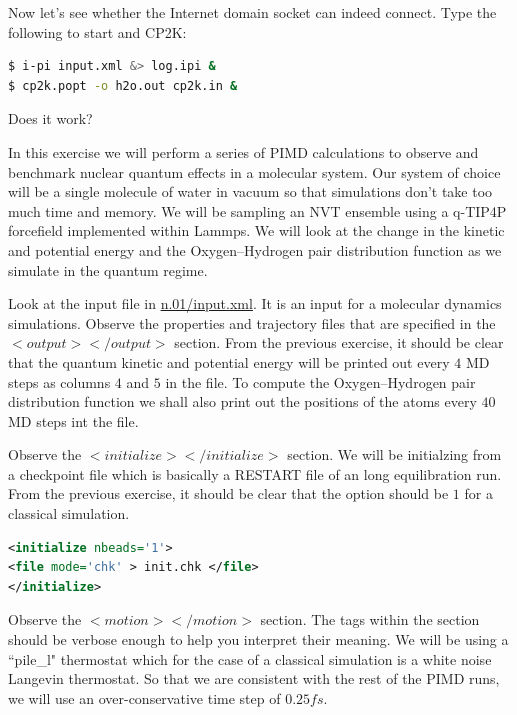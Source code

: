 \documentclass{article}
\begin{document}
\begin{Exercise}[label={basic},title={Keywords, outputs, and units of \ipi{}}]
\Question
Now let's see whether the Internet domain socket can indeed connect.
Type the following to start \ipi{} and CP2K:
\begin{lstlisting}[language=bash]
$ i-pi input.xml &> log.ipi &
$ cp2k.popt -o h2o.out cp2k.in &
\end{lstlisting}
Does it work?

\end{Exercise}

\begin{Exercise}[label={basic},title={Benchmark of quantum effects in a water molecule}]
\noindent In this exercise we will perform a series of PIMD calculations to observe and benchmark nuclear quantum effects in a molecular system. Our system of choice will be a single molecule of water in vacuum so that simulations don't take too much time and memory. We will be sampling an NVT ensemble using a q-TIP4P forcefield implemented within Lammps. We will look at the change in the kinetic and potential energy and the Oxygen--Hydrogen pair distribution function as we simulate in the quantum regime.

\Question
Look at the \ipi{} input file in \url{n.01/input.xml}. It is an \ipi{} input for a molecular dynamics simulations. Observe the 
properties and trajectory files that are specified in the \lstinxml$<output></output>$ section. From the previous exercise, it should be clear that the quantum kinetic and potential energy will be printed out every $4$ MD steps as columns $4$ and $5$ in the  file. To compute the Oxygen--Hydrogen pair distribution function we shall also print out the positions of the atoms every $40$ MD steps int the  file.

\Question
Observe the \lstinxml$<initialize></initialize>$ section. We will be initialzing from a checkpoint file  which is basically a RESTART file of an long equilibration run. From the previous exercise, it should be clear that the option  should be $1$ for a classical simulation.

\begin{lstlisting}[language=xml]
<initialize nbeads='1'>  
<file mode='chk' > init.chk </file>
</initialize>
\end{lstlisting}

\Question
Observe the \lstinxml$<motion></motion>$ section. The tags within the section should be verbose enough to help you interpret their meaning. We will be using a ``pile\_l" thermostat which for the case of a classical simulation is a white noise Langevin thermostat. So that we are consistent with the rest of the PIMD runs, we will use an over-conservative time step of $0.25 fs$. 


\end{Exercise}
\end{document}

